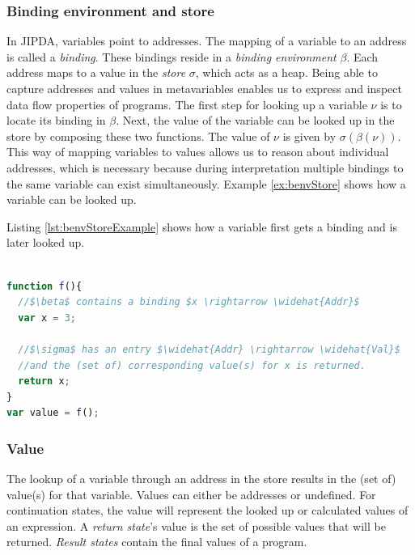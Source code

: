 \subsubsection*{Binding environment and store}

In JIPDA, variables point to addresses. The mapping of a variable to an address is called a \textit{binding}. These bindings reside in a \textit{binding environment} $\beta$. Each address maps to a value in the \textit{store} $\sigma$, which acts as a heap. Being able to capture addresses and values in metavariables enables us to express and inspect data flow properties of programs. The first step for looking up a variable $\nu$ is to locate its binding in $\beta$. Next, the value of the variable can be looked up in the store by composing these two functions. The value of $\nu$ is given by $\sigma(\beta(\nu))$. This way of mapping variables to values allows us to reason about individual addresses, which is necessary because during interpretation multiple bindings to the same variable can exist simultaneously. Example \ref{ex:benvStore} shows how a variable can be looked up.
\begin{exmp}
\label{ex:benvStore}
Listing \ref{lst:benvStoreExample} shows how a variable first gets a binding and is later looked up.
\\
\begin{lstlisting}[label={lst:benvStoreExample},language=JavaScript,caption=Example of the binding environment and store workings, mathescape=true]  % float=t?

function f(){
  //$\beta$ contains a binding $x \rightarrow \widehat{Addr}$
  var x = 3; 
  
  //$\sigma$ has an entry $\widehat{Addr} \rightarrow \widehat{Val}$
  //and the (set of) corresponding value(s) for x is returned. 
  return x;
}
var value = f();
\end{lstlisting}
\end{exmp}


\subsubsection*{Value}
The lookup of a variable through an address in the store results in the (set of) value(s) for that variable. Values can either be addresses or undefined. For continuation states, the value will represent the looked up or calculated values of an expression. A \textit{return state}'s value is the set of possible values that will be returned. \textit{Result states} contain the final values of a program.

